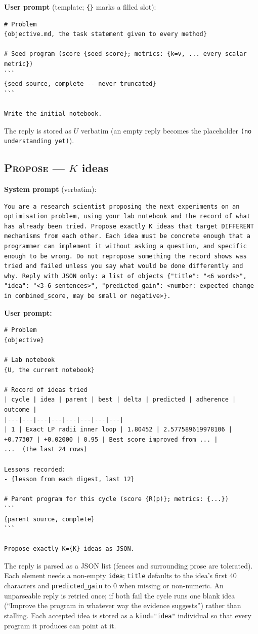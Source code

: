 \documentclass[11pt]{article}
\newcommand{\call}[1]{\textsc{#1}}
\begin{document}
\noindent\textbf{User prompt} (template; \texttt{\{\}} marks a filled slot):
\begin{lstlisting}
# Problem
{objective.md, the task statement given to every method}

# Seed program (score {seed score}; metrics: {k=v, ... every scalar metric})
```
{seed source, complete -- never truncated}
```

Write the initial notebook.
\end{lstlisting}
The reply is stored as $U$ verbatim (an empty reply becomes the placeholder
\texttt{(no understanding yet)}).

\subsection{\call{Propose} --- $K$ ideas}

\noindent\textbf{System prompt} (verbatim):
\begin{lstlisting}
You are a research scientist proposing the next experiments on an optimisation problem, using your lab notebook and the record of what has already been tried. Propose exactly K ideas that target DIFFERENT mechanisms from each other. Each idea must be concrete enough that a programmer can implement it without asking a question, and specific enough to be wrong. Do not repropose something the record shows was tried and failed unless you say what would be done differently and why. Reply with JSON only: a list of objects {"title": "<6 words>", "idea": "<3-6 sentences>", "predicted_gain": <number: expected change in combined_score, may be small or negative>}.
\end{lstlisting}

\noindent\textbf{User prompt:}
\begin{lstlisting}
# Problem
{objective}

# Lab notebook
{U, the current notebook}

# Record of ideas tried
| cycle | idea | parent | best | delta | predicted | adherence | outcome |
|---|---|---|---|---|---|---|---|
| 1 | Exact LP radii inner loop | 1.80452 | 2.577589619978106 | +0.77307 | +0.02000 | 0.95 | Best score improved from ... |
...  (the last 24 rows)

Lessons recorded:
- {lesson from each digest, last 12}

# Parent program for this cycle (score {R(p)}; metrics: {...})
```
{parent source, complete}
```

Propose exactly K={K} ideas as JSON.
\end{lstlisting}
The reply is parsed as a JSON list (fences and surrounding prose are tolerated). Each element
needs a non-empty \texttt{idea}; \texttt{title} defaults to the idea's first 40 characters and
\texttt{predicted\_gain} to 0 when missing or non-numeric. An unparseable reply is retried once;
if both fail the cycle runs one blank idea (``Improve the program in whatever way the evidence
suggests'') rather than stalling. Each accepted idea is stored as a \texttt{kind="idea"}
individual so that every program it produces can point at it.
\end{document}
